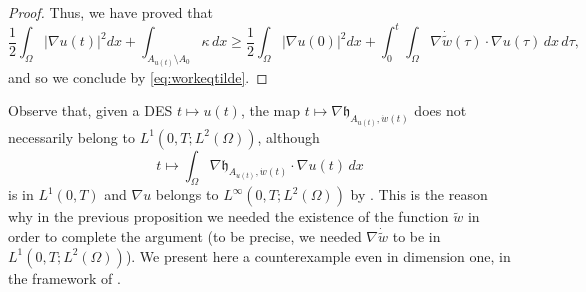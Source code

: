 \documentclass[a4paper,11pt,reqno]{amsart}
\numberwithin{equation}{section}
\theoremstyle{definition}
\theoremstyle{remark}
\begin{document}
\begin{proof}
    Thus, we have proved that
    \begin{equation}
            \frac 12 \int_\Omega |\nabla u(t)|^2 dx+\int_{A_{u(t)}\setminus A_0}\kappa\,d x\ge   \frac 12 \int_\Omega |\nabla u(0)|^2 dx+\int_0^t \int_\Omega \nabla \dot{\widetilde w}(\tau)\cdot \nabla u(\tau) \, dx\, d\tau,
        \end{equation}
        and so we conclude by \eqref{eq:workeqtilde}.   
    \end{proof}
    
        Observe that, given a DES $t\mapsto u(t)$, the map $t\mapsto \nabla \mathfrak{h}_{A_{u(t)},\dot w(t)}$ does not necessarily belong to $L^1(0,T;L^2(\Omega))$, although
        \begin{equation}
            \displaystyle t\mapsto \int_\Omega \nabla \mathfrak{h}_{A_{u(t)},\dot w(t)}\cdot \nabla u(t) \, dx
        \end{equation}
        is in $L^1(0,T)$ and $\nabla u$ belongs to $L^\infty(0,T;L^2(\Omega))$ by . This is the reason why in the previous proposition we needed the existence of the function $\widetilde w$ in order to complete the argument (to be precise, we needed $\nabla\dot{\widetilde w}$ to be in $L^1(0,T;L^2(\Omega))$). We present here a counterexample even in dimension one, in the framework of .
\end{document}
